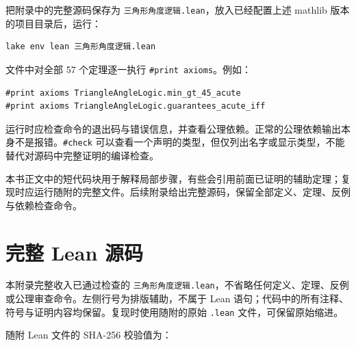 \documentclass[UTF8,a4paper,zihao=-4,oneside,openany,fontset=fandol]{ctexbook}
\theoremstyle{definition}
\theoremstyle{remark}
\begin{document}
把附录中的完整源码保存为 \texttt{三角形角度逻辑.lean}，放入已经配置上述 mathlib 版本的项目目录后，运行：
\begin{Verbatim}[fontsize=\small,breaklines=true]
lake env lean 三角形角度逻辑.lean
\end{Verbatim}

文件中对全部 57 个定理逐一执行 \texttt{\#print axioms}。例如：
\begin{Verbatim}[fontsize=\small,breaklines=true]
#print axioms TriangleAngleLogic.min_gt_45_acute
#print axioms TriangleAngleLogic.guarantees_acute_iff
\end{Verbatim}

运行时应检查命令的退出码与错误信息，并查看公理依赖。正常的公理依赖输出本身不是报错。\texttt{\#check} 可以查看一个声明的类型，但仅列出名字或显示类型，不能替代对源码中完整证明的编译检查。

本书正文中的短代码块用于解释局部步骤，有些会引用前面已证明的辅助定理；复现时应运行随附的完整文件。后续附录给出完整源码，保留全部定义、定理、反例与依赖检查命令。



\appendix
\chapter{完整 Lean 源码}
\label{app:complete-code}

本附录完整收入已通过检查的 \texttt{三角形角度逻辑.lean}，不省略任何定义、定理、反例或公理审查命令。左侧行号为排版辅助，不属于 Lean 语句；代码中的所有注释、符号与证明内容均保留。复现时使用随附的原始 \texttt{.lean} 文件，可保留原始缩进。

随附 Lean 文件的 SHA-256 校验值为：
\begin{quote}\small{}\end{quote}
\end{document}
